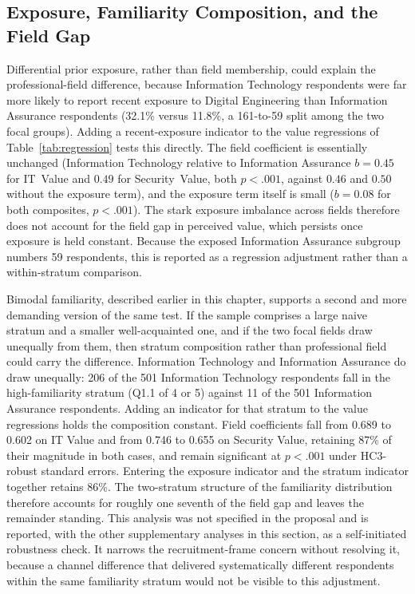 \subsection{Exposure, Familiarity Composition, and the Field Gap}

Differential prior exposure, rather than field membership, could explain the professional-field difference, because Information Technology respondents were far more likely to report recent exposure to Digital Engineering than Information Assurance respondents (32.1\% versus 11.8\%, a 161-to-59 split among the two focal groups). Adding a recent-exposure indicator to the value regressions of Table~\ref{tab:regression} tests this directly. The field coefficient is essentially unchanged (Information Technology relative to Information Assurance $b=0.45$ for IT~Value and $0.49$ for Security~Value, both $p<.001$, against $0.46$ and $0.50$ without the exposure term), and the exposure term itself is small ($b=0.08$ for both composites, $p<.001$). The stark exposure imbalance across fields therefore does not account for the field gap in perceived value, which persists once exposure is held constant. Because the exposed Information Assurance subgroup numbers 59 respondents, this is reported as a regression adjustment rather than a within-stratum comparison.

Bimodal familiarity, described earlier in this chapter, supports a second and more demanding version of the same test. If the sample comprises a large naive stratum and a smaller well-acquainted one, and if the two focal fields draw unequally from them, then stratum composition rather than professional field could carry the difference. Information Technology and Information Assurance do draw unequally: 206 of the 501 Information Technology respondents fall in the high-familiarity stratum (Q1.1 of 4 or 5) against 11 of the 501 Information Assurance respondents. Adding an indicator for that stratum to the value regressions holds the composition constant. Field coefficients fall from 0.689 to 0.602 on IT Value and from 0.746 to 0.655 on Security Value, retaining 87\% of their magnitude in both cases, and remain significant at $p<.001$ under HC3-robust standard errors. Entering the exposure indicator and the stratum indicator together retains 86\%. The two-stratum structure of the familiarity distribution therefore accounts for roughly one seventh of the field gap and leaves the remainder standing. This analysis was not specified in the proposal and is reported, with the other supplementary analyses in this section, as a self-initiated robustness check. It narrows the recruitment-frame concern without resolving it, because a channel difference that delivered systematically different respondents within the same familiarity stratum would not be visible to this adjustment.

